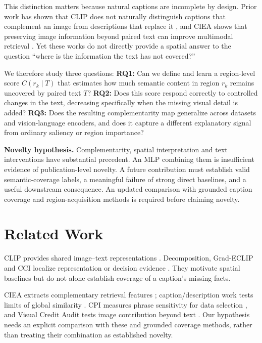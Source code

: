 \documentclass[10pt,twocolumn]{article}
\begin{document}
This distinction matters because natural captions are incomplete by design. Prior work has shown that CLIP does not naturally distinguish captions that complement an image from descriptions that replace it \cite{zur2024}, and CIEA shows that preserving image information beyond paired text can improve multimodal retrieval \cite{zeng2025}. Yet these works do not directly provide a spatial answer to the question ``where is the information the text has not covered?''

We therefore study three questions:
\textbf{RQ1:} Can we define and learn a region-level score $C(r_k\mid T)$ that estimates how much semantic content in region $r_k$ remains uncovered by paired text $T$?
\textbf{RQ2:} Does this score respond correctly to controlled changes in the text, decreasing specifically when the missing visual detail is added?
\textbf{RQ3:} Does the resulting complementarity map generalize across datasets and vision-language encoders, and does it capture a different explanatory signal from ordinary saliency or region importance?

\textbf{Novelty hypothesis.} Complementarity, spatial interpretation and text interventions have substantial precedent. An MLP combining them is insufficient evidence of publication-level novelty. A future contribution must establish valid semantic-coverage labels, a meaningful failure of strong direct baselines, and a useful downstream consequence. An updated comparison with grounded caption coverage and region-acquisition methods is required before claiming novelty.

\section{Related Work}
CLIP provides shared image--text representations \cite{radford2021}. Decomposition, Grad-ECLIP and CCI localize representation or decision evidence \cite{gandelsman2024,zhao2026,agarwal2026}. They motivate spatial baselines but do not alone establish coverage of a caption's missing facts.

CIEA extracts complementary retrieval features \cite{zeng2025}; caption/description work tests limits of global similarity \cite{zur2024}. CPI measures phrase sensitivity for data selection \cite{go2026}, and Visual Credit Audit tests image contribution beyond text \cite{liu2026vca}. Our hypothesis needs an explicit comparison with these and grounded coverage methods, rather than treating their combination as established novelty.
\end{document}
